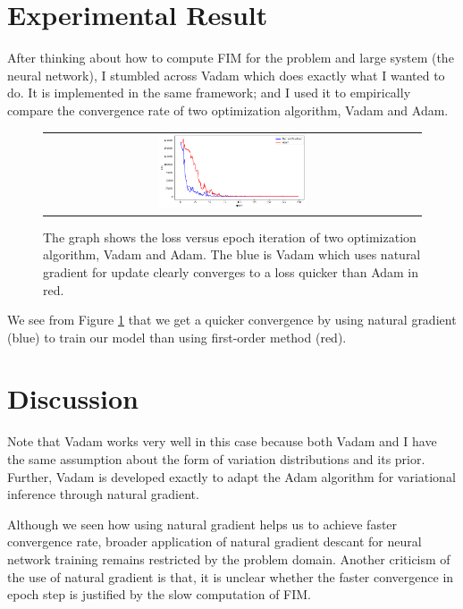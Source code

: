 \documentclass[10pt,twocolumn,letterpaper]{article}
\begin{document}
\section{Experimental Result}
After thinking about how to compute FIM for the problem and large system (the neural network), I stumbled across Vadam \cite{khan2018fast} which does exactly what I wanted to do. 
It is implemented in the same framework; and I used it to empirically compare the convergence rate of two optimization algorithm, Vadam and Adam.
\begin{figure}[h]
\begin{tabular}{c}
     \includegraphics[width=0.4\textwidth]{images/vadam_compare.png}
\end{tabular}
\caption{The graph shows the loss versus epoch iteration of two optimization algorithm, Vadam and Adam. The blue is Vadam which uses natural gradient for update clearly converges to a loss quicker than Adam in red.}
    \label{fig:vadam_compare}
\end{figure}

We see from Figure \ref{fig:vadam_compare} that we get a quicker convergence by using natural gradient (blue) to train our model than using first-order method (red).

\section{Discussion}
Note that Vadam works very well in this case because both Vadam and I have the same assumption about the form of variation distributions and its prior. Further, Vadam is developed exactly to adapt the Adam algorithm for variational inference through natural gradient.

Although we seen how using natural gradient helps us to achieve faster convergence rate, broader application of natural gradient descant for neural network training remains restricted by the problem domain. 
Another criticism of the use of natural gradient is that, it is unclear whether the faster convergence in epoch step is justified by the slow computation of FIM. 
\end{document}
